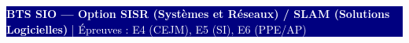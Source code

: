 \documentclass[a4paper,9pt]{article}
\begin{document}
\vspace{3pt}
\begin{center}
  \colorbox{navy}{\parbox{\dimexpr\textwidth-2\fboxsep}{
    \centering\vspace{1pt}
    \small\textcolor{white}{\textbf{BTS SIO — Option SISR (Systèmes et Réseaux) / SLAM (Solutions Logicielles)} \quad|\quad
    Épreuves : E4 (CEJM), E5 (SI), E6 (PPE/AP)}
    \vspace{1pt}
  }}
\end{center}
\end{document}
